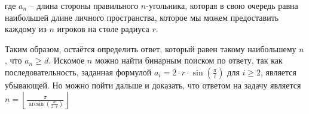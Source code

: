 где $a_n$ -- длина стороны правильного $n$-угольника, которая в свою очередь равна наибольшей длине личного пространства, которое мы можем предоставить каждому из $n$ игроков на столе радиуса $r$.

Таким образом, остаётся определить ответ, который равен такому наибольшему $n$, что $a_n \ge d$. Искомое $n$ можно найти бинарным поиском по ответу, так как последовательность, заданная формулой $a_i = 2 \cdot r \cdot \sin(\frac{\pi}{i})$ для $i \ge 2$, является убывающей. Но можно пойти дальше и доказать, что ответом на задачу является $n = \left \lfloor \frac{\pi}{\arcsin(\frac{d}{2 \cdot r})} \right \rfloor$

\codeExample

{}